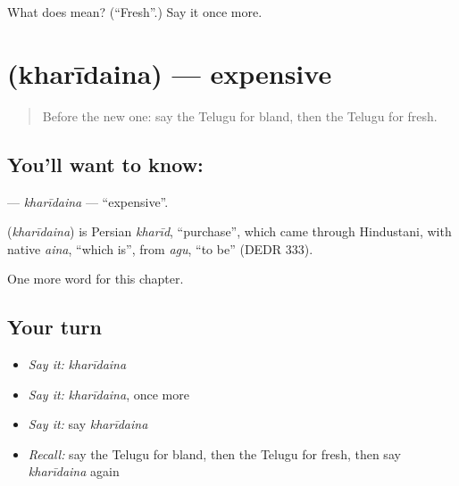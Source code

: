 \begin{tcolorbox}[breakable,colback=teal!4,colframe=teal!35!black,title={Before you move on}]
What does  mean? (\textquotedblleft{}Fresh\textquotedblright{}.) Say it once more.
\end{tcolorbox}
\section[\texorpdfstring{\te{ఖరీదైన} (kharīdaina)}{ఖరీదైన (kharīdaina)}]{ (kharīdaina) — expensive}

\label{lesson:TE-C179-kharidaina}



\begin{quote}
Before the new one: say the Telugu for bland, then the Telugu for fresh.
\end{quote}

\subsection*{You'll want to know: }
\textbf{} — \emph{kharīdaina} — \textquotedblleft{}expensive\textquotedblright{}.

\begin{cousinweb}
\textbf{} (\emph{kharīdaina}) is Persian \emph{kharīd}, \textquotedblleft{}purchase\textquotedblright{}, which came through Hindustani, with native \emph{aina}, \textquotedblleft{}which is\textquotedblright{}, from \emph{agu}, \textquotedblleft{}to be\textquotedblright{} (DEDR 333).
\end{cousinweb}

\begin{grammarlens}[title={What you've built}]
One more word for this chapter.
\end{grammarlens}

\subsection*{Your turn}
\begin{itemize}
\raggedright
  \item \emph{Say it:} \emph{kharīdaina}
  \item \emph{Say it:} \emph{kharīdaina}, once more
  \item \emph{Say it:} say \emph{kharīdaina}
  \item \emph{Recall:} say the Telugu for bland, then the Telugu for fresh, then say \emph{kharīdaina} again
\end{itemize}

